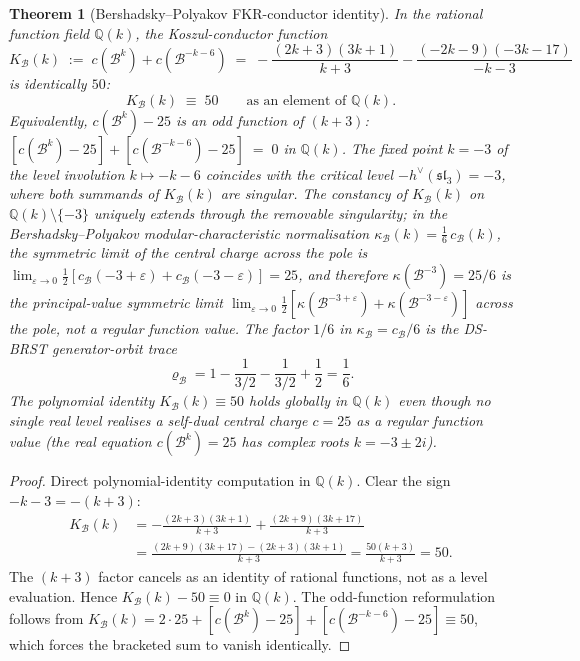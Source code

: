 \documentclass[11pt]{article}
\theoremstyle{plain}
\newtheorem{theorem}{Theorem}[section]
\theoremstyle{definition}
\theoremstyle{remark}
\newcommand{\fsl}{\mathfrak{sl}}
\newcommand{\cB}{\mathcal{B}}
\numberwithin{equation}{section}
\begin{document}
\begin{theorem}[Bershadsky--Polyakov FKR-conductor identity]
\label{thm:bp-koszul-conductor-polynomial}
In the rational function field $\mathbb{Q}(k)$, the Koszul-conductor function
\[
 K_{\cB}(k)
 \;:=\;
 c(\cB^k) + c(\cB^{-k-6})
 \;=\;
 -\frac{(2k+3)(3k+1)}{k+3}
 -\frac{(-2k-9)(-3k-17)}{-k-3}
\]
is identically $50$:
\[
 K_{\cB}(k) \;\equiv\; 50 \qquad \text{as an element of } \mathbb{Q}(k).
\]
Equivalently, $c(\cB^k) - 25$ is an \emph{odd} function of $(k+3)$:
$[c(\cB^k) - 25] + [c(\cB^{-k-6}) - 25] \;=\; 0$ in $\mathbb{Q}(k)$.
The fixed point $k = -3$ of the level involution $k \mapsto -k-6$ coincides
with the critical level $-h^\vee(\fsl_3) = -3$, where both summands of
$K_{\cB}(k)$ are singular. The constancy of $K_{\cB}(k)$ on
$\mathbb{Q}(k) \setminus \{-3\}$ uniquely extends through the removable
singularity; in the Bershadsky--Polyakov modular-characteristic
 normalisation $\kappa_{\cB}(k) = \tfrac{1}{6}\, c_{\cB}(k)$,
 the symmetric limit of the central charge across the pole is
$\lim_{\varepsilon\to 0} \tfrac{1}{2}[c_{\cB}(-3+\varepsilon)
 + c_{\cB}(-3-\varepsilon)] = 25$, and therefore
$\kappa(\cB^{-3}) = 25/6$ is the principal-value
symmetric limit $\lim_{\varepsilon\to 0} \tfrac{1}{2}[\kappa(\cB^{-3+\varepsilon})
+ \kappa(\cB^{-3-\varepsilon})]$ across the pole, not a regular function
value. The factor $1/6$ in $\kappa_{\cB} = c_{\cB}/6$ is the
DS-BRST generator-orbit trace
\[
\varrho_{\cB}
=1-\frac{1}{3/2}-\frac{1}{3/2}+\frac12=\frac16.
\]
The polynomial
identity $K_{\cB}(k) \equiv 50$ holds globally in
$\mathbb{Q}(k)$ even though no single real level realises a self-dual central
charge $c = 25$ as a regular function value (the real equation
$c(\cB^k) = 25$ has complex roots $k = -3 \pm 2i$).
\end{theorem}

\begin{proof}
Direct polynomial-identity computation in $\mathbb{Q}(k)$. Clear the sign
$-k-3 = -(k+3)$:
\begin{align*}
 K_{\cB}(k)
 &= -\frac{(2k+3)(3k+1)}{k+3}
 + \frac{(2k+9)(3k+17)}{k+3} \\
 &= \frac{(2k+9)(3k+17)-(2k+3)(3k+1)}{k+3}
 = \frac{50(k+3)}{k+3}
 = 50.
\end{align*}
The $(k+3)$ factor cancels as an identity of rational functions,
not as a level evaluation. Hence $K_{\cB}(k) - 50 \equiv 0$ in
$\mathbb{Q}(k)$. The odd-function reformulation follows from
$K_{\cB}(k) = 2 \cdot 25 + [c(\cB^k) - 25] + [c(\cB^{-k-6}) - 25] \equiv 50$,
which forces the bracketed sum to vanish identically.
\end{proof}
\end{document}
